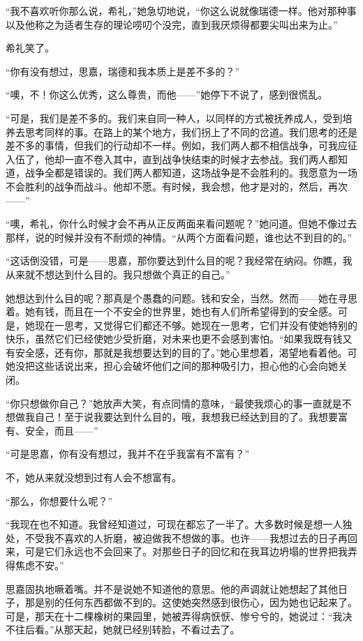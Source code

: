 \par “我不喜欢听你那么说，希礼，”她急切地说，“你这么说就像瑞德一样。他对那种事以及他称之为适者生存的理论唠叨个没完，直到我厌烦得都要尖叫出来为止。”
\par 希礼笑了。
\par “你有没有想过，思嘉，瑞德和我本质上是差不多的？”
\par “噢，不！你这么优秀，这么尊贵，而他——”她停下不说了，感到很慌乱。
\par “可是，我们是差不多的。我们来自同一种人，以同样的方式被抚养成人，受到培养去思考同样的事。在路上的某个地方，我们拐上了不同的岔道。我们思考的还是差不多的事情，但我们的行动却不一样。例如，我们两人都不相信战争，可我应征入伍了，他却一直不卷入其中，直到战争快结束的时候才去参战。我们两人都知道，战争全都是错误的。我们两人都知道，这场战争是不会胜利的。我愿意为一场不会胜利的战争而战斗。他却不愿。有时候，我会想，他才是对的，然后，再次——”
\par “噢，希礼，你什么时候才会不再从正反两面来看问题呢？”她问道。但她不像过去那样，说的时候并没有不耐烦的神情。“从两个方面看问题，谁也达不到目的的。”
\par “这话倒没错，可是——思嘉，那你要达到什么目的呢？我经常在纳闷。你瞧，我从来就不想达到什么目的。我只想做个真正的自己。”
\par 她想达到什么目的呢？那真是个愚蠢的问题。钱和安全，当然。然而——她在寻思着。她有钱，而且在一个不安全的世界里，她也有人们所希望得到的安全感。可是，她现在一思考，又觉得它们都还不够。她现在一思考，它们并没有使她特别的快乐，虽然它们已经使她少受折磨，对未来也更不会感到害怕。“如果我既有钱又有安全感，还有你，那就是我想要达到的目的了。”她心里想着，渴望地看着他。可她没把这些话说出来，担心会破坏他们之间的那种吸引力，担心他的心会向她关闭。
\par “你只想做你自己？”她放声大笑，有点同情的意味，“最使我烦心的事一直就是不想做我自己！至于说我要达到什么目的，哦，我想我已经达到目的了。我想要富有、安全，而且——”
\par “可是思嘉，你有没有想过，我并不在乎我富有不富有？”
\par 不，她从来就没想到过有人会不想富有。
\par “那么，你想要什么呢？”
\par “我现在也不知道。我曾经知道过，可现在都忘了一半了。大多数时候是想一人独处，不受我不喜欢的人折磨，被迫做我不想做的事。也许——我想过去的日子再回来，可是它们永远也不会回来了。对那些日子的回忆和在我耳边坍塌的世界把我弄得焦虑不安。”
\par 思嘉固执地噘着嘴。并不是说她不知道他的意思。他的声调就让她想起了其他日子，那是别的任何东西都做不到的。这使她突然感到很伤心，因为她也记起来了。可是，那天在十二棵橡树的果园里，她被弄得病恹恹、惨兮兮的，她说过：“我决不往后看。”从那天起，她就已经别转脸，不看过去了。
